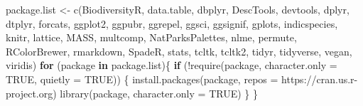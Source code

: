 \documentclass[
]{article}
\newenvironment{Shaded}{\begin{snugshade}}{\end{snugshade}}
\newcommand{\AttributeTok}[1]{\textcolor[rgb]{0.77,0.63,0.00}{#1}}
\newcommand{\ConstantTok}[1]{\textcolor[rgb]{0.00,0.00,0.00}{#1}}
\newcommand{\ControlFlowTok}[1]{\textcolor[rgb]{0.13,0.29,0.53}{\textbf{#1}}}
\newcommand{\FunctionTok}[1]{\textcolor[rgb]{0.00,0.00,0.00}{#1}}
\newcommand{\NormalTok}[1]{#1}
\newcommand{\OtherTok}[1]{\textcolor[rgb]{0.56,0.35,0.01}{#1}}
\newcommand{\SpecialCharTok}[1]{\textcolor[rgb]{0.00,0.00,0.00}{#1}}
\newcommand{\StringTok}[1]{\textcolor[rgb]{0.31,0.60,0.02}{#1}}
\begin{document}
\begin{Shaded}
\begin{Highlighting}[]
\NormalTok{package.list }\OtherTok{\textless{}{-}} \FunctionTok{c}\NormalTok{(}\StringTok{\textquotesingle{}BiodiversityR\textquotesingle{}}\NormalTok{, }\StringTok{\textquotesingle{}data.table\textquotesingle{}}\NormalTok{, }\StringTok{\textquotesingle{}dbplyr\textquotesingle{}}\NormalTok{, }\StringTok{\textquotesingle{}DescTools\textquotesingle{}}\NormalTok{, }\StringTok{\textquotesingle{}devtools\textquotesingle{}}\NormalTok{, }\StringTok{\textquotesingle{}dplyr\textquotesingle{}}\NormalTok{, }\StringTok{\textquotesingle{}dtplyr\textquotesingle{}}\NormalTok{, }\StringTok{\textquotesingle{}forcats\textquotesingle{}}\NormalTok{, }\StringTok{\textquotesingle{}ggplot2\textquotesingle{}}\NormalTok{, }\StringTok{\textquotesingle{}ggpubr\textquotesingle{}}\NormalTok{, }\StringTok{\textquotesingle{}ggrepel\textquotesingle{}}\NormalTok{, }\StringTok{\textquotesingle{}ggsci\textquotesingle{}}\NormalTok{, }\StringTok{\textquotesingle{}ggsignif\textquotesingle{}}\NormalTok{, }\StringTok{\textquotesingle{}gplots\textquotesingle{}}\NormalTok{, }\StringTok{\textquotesingle{}indicspecies\textquotesingle{}}\NormalTok{, }\StringTok{\textquotesingle{}knitr\textquotesingle{}}\NormalTok{, }\StringTok{\textquotesingle{}lattice\textquotesingle{}}\NormalTok{, }\StringTok{\textquotesingle{}MASS\textquotesingle{}}\NormalTok{, }\StringTok{\textquotesingle{}multcomp\textquotesingle{}}\NormalTok{, }\StringTok{\textquotesingle{}NatParksPalettes\textquotesingle{}}\NormalTok{, }\StringTok{\textquotesingle{}nlme\textquotesingle{}}\NormalTok{, }\StringTok{\textquotesingle{}permute\textquotesingle{}}\NormalTok{, }\StringTok{\textquotesingle{}RColorBrewer\textquotesingle{}}\NormalTok{, }\StringTok{\textquotesingle{}rmarkdown\textquotesingle{}}\NormalTok{, }\StringTok{\textquotesingle{}SpadeR\textquotesingle{}}\NormalTok{, }\StringTok{\textquotesingle{}stats\textquotesingle{}}\NormalTok{, }\StringTok{\textquotesingle{}tcltk\textquotesingle{}}\NormalTok{, }\StringTok{\textquotesingle{}tcltk2\textquotesingle{}}\NormalTok{, }\StringTok{\textquotesingle{}tidyr\textquotesingle{}}\NormalTok{, }\StringTok{\textquotesingle{}tidyverse\textquotesingle{}}\NormalTok{, }\StringTok{\textquotesingle{}vegan\textquotesingle{}}\NormalTok{, }\StringTok{\textquotesingle{}viridis\textquotesingle{}}\NormalTok{)}
\ControlFlowTok{for}\NormalTok{ (package }\ControlFlowTok{in}\NormalTok{ package.list)\{}
  \ControlFlowTok{if}\NormalTok{ (}\SpecialCharTok{!}\FunctionTok{require}\NormalTok{(package, }\AttributeTok{character.only =} \ConstantTok{TRUE}\NormalTok{, }\AttributeTok{quietly =} \ConstantTok{TRUE}\NormalTok{)) \{}
    \FunctionTok{install.packages}\NormalTok{(package, }\AttributeTok{repos =} \StringTok{\textquotesingle{}https://cran.us.r{-}project.org\textquotesingle{}}\NormalTok{)}
    \FunctionTok{library}\NormalTok{(package, }\AttributeTok{character.only =} \ConstantTok{TRUE}\NormalTok{)}
\NormalTok{  \}}
\NormalTok{\}}
\end{Highlighting}
\end{Shaded}
\end{document}
